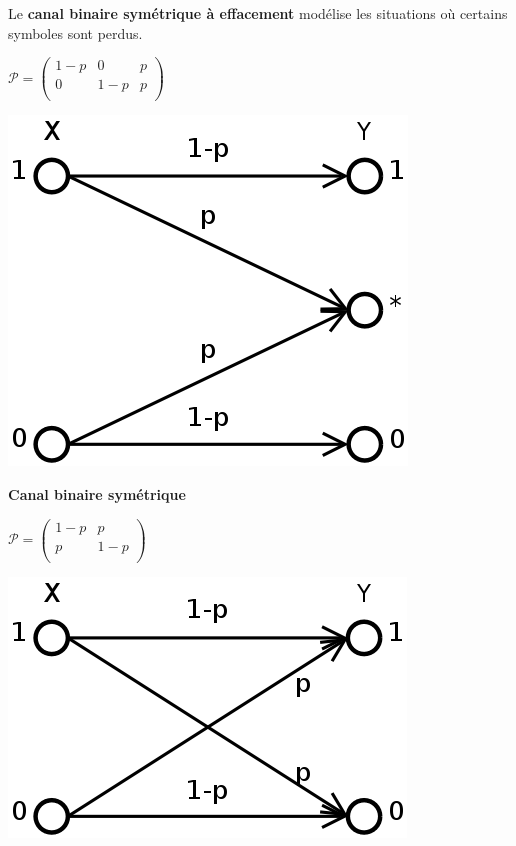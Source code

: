 \documentclass[a4paper,10pt]{leaflet}
\begin{document}
\begin{multicols}{2}
 \raggedcolumns
 Le \textbf{canal binaire symétrique à effacement} modélise les situations où certains symboles sont perdus.

\begin{center}
 $ \mathcal{P} = \begin{pmatrix}
 1-p & 0 & p\\
 0 & 1-p & p\\
 \end{pmatrix}$
\end{center}

 \includegraphics[width=0.9\linewidth]{cbse}
\end{multicols}
\clearpage
\begin{multicols}{2}
 \raggedcolumns
 \textbf{Canal binaire symétrique}

\begin{center}
$ \mathcal{P} = \left(
\begin{array}{cc}
 1-p & p\\
 p & 1-p\\
\end{array}
\right)$
\end{center}

 \includegraphics[width=\linewidth]{cbs}
\end{multicols}
\end{document}
